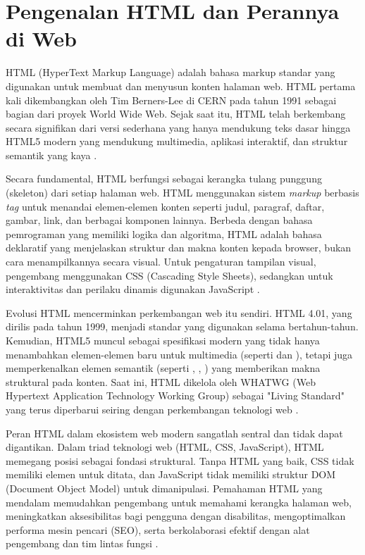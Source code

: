 \section{Pengenalan HTML dan Perannya di Web}

HTML (HyperText Markup Language) adalah bahasa markup standar yang digunakan untuk membuat dan menyusun konten halaman web. HTML pertama kali dikembangkan oleh Tim Berners-Lee di CERN pada tahun 1991 sebagai bagian dari proyek World Wide Web. Sejak saat itu, HTML telah berkembang secara signifikan dari versi sederhana yang hanya mendukung teks dasar hingga HTML5 modern yang mendukung multimedia, aplikasi interaktif, dan struktur semantik yang kaya \cite{mdnHtmlIntro}.

Secara fundamental, HTML berfungsi sebagai kerangka tulang punggung (skeleton) dari setiap halaman web. HTML menggunakan sistem \textit{markup} berbasis \textit{tag} untuk menandai elemen-elemen konten seperti judul, paragraf, daftar, gambar, link, dan berbagai komponen lainnya. Berbeda dengan bahasa pemrograman yang memiliki logika dan algoritma, HTML adalah bahasa deklaratif yang menjelaskan struktur dan makna konten kepada browser, bukan cara menampilkannya secara visual. Untuk pengaturan tampilan visual, pengembang menggunakan CSS (Cascading Style Sheets), sedangkan untuk interaktivitas dan perilaku dinamis digunakan JavaScript \cite{webdevHtml}.

Evolusi HTML mencerminkan perkembangan web itu sendiri. HTML 4.01, yang dirilis pada tahun 1999, menjadi standar yang digunakan selama bertahun-tahun. Kemudian, HTML5 muncul sebagai spesifikasi modern yang tidak hanya menambahkan elemen-elemen baru untuk multimedia (seperti  dan ), tetapi juga memperkenalkan elemen semantik (seperti , , ) yang memberikan makna struktural pada konten. Saat ini, HTML dikelola oleh WHATWG (Web Hypertext Application Technology Working Group) sebagai "Living Standard" yang terus diperbarui seiring dengan perkembangan teknologi web \cite{whatwgHtml}.

Peran HTML dalam ekosistem web modern sangatlah sentral dan tidak dapat digantikan. Dalam triad teknologi web (HTML, CSS, JavaScript), HTML memegang posisi sebagai fondasi struktural. Tanpa HTML yang baik, CSS tidak memiliki elemen untuk ditata, dan JavaScript tidak memiliki struktur DOM (Document Object Model) untuk dimanipulasi. Pemahaman HTML yang mendalam memudahkan pengembang untuk memahami kerangka halaman web, meningkatkan aksesibilitas bagi pengguna dengan disabilitas, mengoptimalkan performa mesin pencari (SEO), serta berkolaborasi efektif dengan alat pengembang dan tim lintas fungsi \cite{mdnLearn}.

